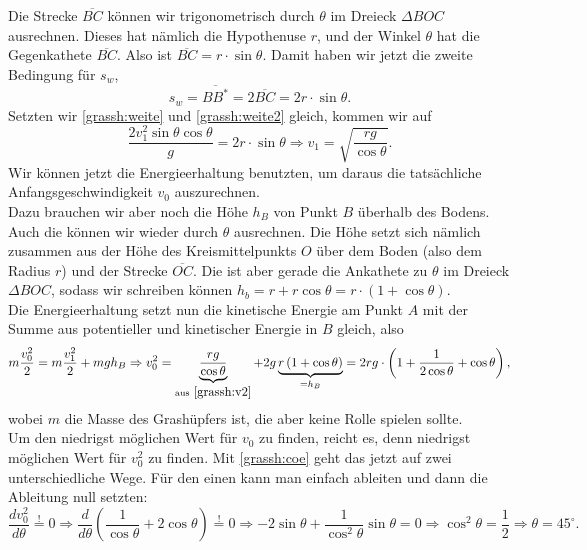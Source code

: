 \begin{Answer}
	Die Strecke $\overline{BC}$ können wir trigonometrisch durch $\theta$ im Dreieck $\Delta BOC$ ausrechnen. Dieses hat nämlich die Hypothenuse $r$, und der Winkel $\theta$ hat die Gegenkathete $\overline{BC}$. Also ist $\overline{BC} = r\cdot \sin \theta$. Damit haben wir jetzt die zweite Bedingung für $s_w$,
	\begin{equation}\label{grassh:weite2}
		s_w = \overline{BB^\ast} = 2 \overline{BC} = 2 r\cdot \sin \theta.
	\end{equation}
	Setzten wir \eqref{grassh:weite} und \eqref{grassh:weite2} gleich, kommen wir auf
	\begin{equation}\label{grassh:v2}
		\frac{2v_1^2\sin \theta \cos \theta}{g} = 2 r\cdot \sin \theta \Rightarrow v_1 = \sqrt{\frac{rg}{\cos\theta}}.
	\end{equation}
	Wir können jetzt die Energieerhaltung benutzten, um daraus die tatsächliche Anfangsgeschwindigkeit $v_0$ auszurechnen.\\
	Dazu brauchen wir aber noch die Höhe $h_B$ von Punkt $B$ überhalb des Bodens. Auch die können wir wieder durch $\theta$ ausrechnen. Die Höhe setzt sich nämlich zusammen aus der Höhe des Kreismittelpunkts $O$ über dem Boden (also dem Radius $r$) und der Strecke $\overline{OC}$. Die ist aber gerade die Ankathete zu $\theta$ im Dreieck $\Delta BOC$, sodass wir schreiben können $h_b = r + r\cos \theta = r\cdot\left(1+\cos \theta \right).$\\
	Die Energieerhaltung setzt nun die kinetische Energie am Punkt $A$ mit der Summe aus potentieller und kinetischer Energie in $B$ gleich, also
	\begin{equation}\label{grassh:coe}
		m\frac{v_0^2}{2} = m \frac{v_1^2}{2} + m g h_B\Rightarrow v_0^2 = \underbrace{\frac{rg}{\cos\theta}}_{\mathrm{aus}~\eqref{grassh:v2}} + 2g \underbrace{r\left(1+\cos \theta\right)}_{=h_B} =2 rg\cdot\left(1+\frac{1}{2\cos \theta}+ \cos \theta\right),
	\end{equation}
	wobei $m$ die Masse des Grashüpfers ist, die aber keine Rolle spielen sollte. \\
	Um den niedrigst möglichen  Wert für $v_0$ zu finden, reicht es, denn niedrigst möglichen Wert für $v_0^2$ zu finden. Mit \eqref{grassh:coe} geht das jetzt auf zwei unterschiedliche Wege. Für den einen kann man einfach ableiten und dann die Ableitung null setzten:
	\begin{equation}
		\frac{dv_0^2}{d\theta} \overset{!}{=} 0 \Rightarrow \frac{d}{d\theta}\left(\frac{1}{\cos \theta}+2\cos \theta\right)\overset{!}{=} 0\Rightarrow -2\sin \theta + \frac{1}{\cos^2 \theta} \sin \theta = 0 \Rightarrow \cos^2 \theta = \frac{1}{2} \Rightarrow \theta = 45^\circ.

\end{equation}
\end{Answer}
